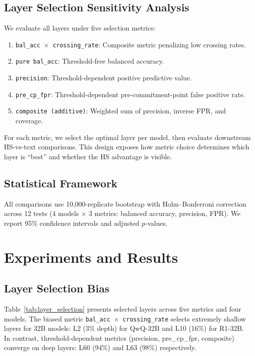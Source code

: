 \documentclass[11pt]{article}
\begin{document}
\subsection{Layer Selection Sensitivity Analysis}
\label{sec:layer_selection}

We evaluate all layers under five selection metrics:

\begin{enumerate}
\item \texttt{bal\_acc $\times$ crossing\_rate}: Composite metric penalizing low crossing rates.
\item \texttt{pure bal\_acc}: Threshold-free balanced accuracy.
\item \texttt{precision}: Threshold-dependent positive predictive value.
\item \texttt{pre\_cp\_fpr}: Threshold-dependent pre-commitment-point false positive rate.
\item \texttt{composite (additive)}: Weighted sum of precision, inverse FPR, and coverage.
\end{enumerate}

For each metric, we select the optimal layer per model, then evaluate downstream HS-vs-text comparisons. This design exposes how metric choice determines which layer is ``best'' and whether the HS advantage is visible.

\subsection{Statistical Framework}

All comparisons use 10,000-replicate bootstrap with Holm--Bonferroni correction across 12 tests (4 models $\times$ 3 metrics: balanced accuracy, precision, FPR). We report 95\% confidence intervals and adjusted $p$-values.


\section{Experiments and Results}

\subsection{Layer Selection Bias}
\label{sec:layer_bias}

Table~\ref{tab:layer_selection} presents selected layers across five metrics and four models. The biased metric \texttt{bal\_acc $\times$ crossing\_rate} selects extremely shallow layers for 32B models: L2 (3\% depth) for QwQ-32B and L10 (16\%) for R1-32B. In contrast, threshold-dependent metrics (precision, pre\_cp\_fpr, composite) converge on deep layers: L60 (94\%) and L63 (98\%) respectively.
\end{document}
